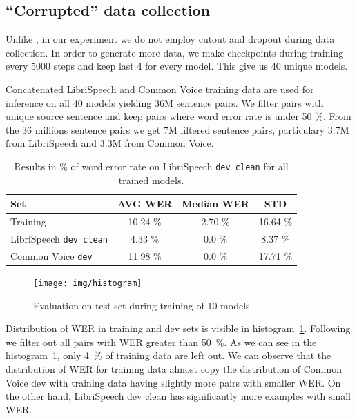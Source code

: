 \subsection{``Corrupted'' data collection}
Unlike , in our experiment we do not employ cutout and dropout during data collection. In order to generate more data, we make checkpoints during training every 5000 steps and keep last 4 for every model. This give us 40 unique models.

Concatenated LibriSpeech and Common Voice training data are used for inference on all 40 models yielding 36M sentence pairs. We filter pairs with unique source sentence and keep pairs where word error rate is under 50 \%. From the 36 millions sentence pairs we get 7M filtered sentence pairs, particulary 3.7M from LibriSpeech and 3.3M from Common Voice.

\begin{table}[t]
		\centering
		\small
		\begin{tabular}{l|ccc}
			\bf Set & \bf AVG WER & \bf Median WER & \bf STD   \\
			\hline 
			Training &  10.24 \% & 2.70 \% & 16.64 \% \\
			LibriSpeech \texttt{dev clean} &  4.33 \% & 0.0 \% & 8.37 \% \\
			Common Voice \texttt{dev} &  11.98 \% & 0.0 \% & 17.71 \% \\
		\end{tabular}
		\caption{Results in \% of word error rate on LibriSpeech \texttt{dev clean} for all trained models.}
		\label{tab:eng_corrupted_table}
\end{table}

\begin{figure}[t]
		\texttt{[image: img/histogram]}
		\caption{Evaluation on test set during training of 10 models.}
		\label{fig:histogram}
\end{figure}

Distribution of WER in training and dev sets is visible in histogram~\ref{fig:histogram}. Following  we filter out all pairs with WER greater than 50~\%. As we can see in the histogram~\ref{fig:histogram}, only 4~\% of training data are left out. We can observe that the distribution of WER for training data almost copy the distribution of Common Voice dev with training data having slightly more pairs with smaller WER. On the other hand, LibriSpeech dev clean has significantly more examples with small WER.


